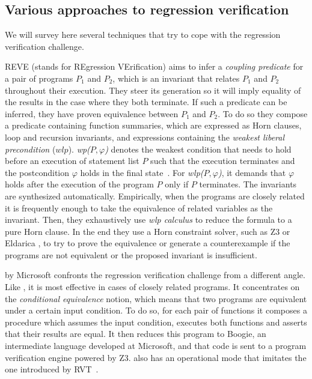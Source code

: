 \subsection{Various approaches to regression verification}
We will survey here several techniques that try to cope with the regression verification challenge.

REVE (stands for REgression VErification) \cite{DBLP:conf/kbse/FelsingGKRU14} aims to infer a \emph{coupling predicate} for a pair of programs $P_1$ and $P_2$, which is an invariant that relates $P_1$ and $P_2$ throughout their execution. They steer its generation so it will imply equality of the results in the case where they both terminate. If such a predicate can be inferred, they have proven equivalence between $P_1$ and $P_2$. To do so they compose a predicate containing function summaries, which are expressed as Horn clauses, loop and recursion invariants, and expressions containing the \emph{weakest liberal precondition} ($wlp$). \emph{wp($P,\varphi$)} denotes the weakest condition that needs to hold before an execution of statement list $P$ such that the execution terminates and the postcondition $\varphi$ holds in the final state~\cite{DBLP:journals/cacm/Dijkstra75}. For \emph{wlp($P,\varphi$)}, it demands that $\varphi$ holds after the execution of the program $P$ only if $P$ terminates. The invariants are synthesized automatically. Empirically, when the programs are closely related it is frequently enough to take the equivalence of related variables as the invariant. Then, they exhaustively use \emph{wlp calculus} to reduce the formula to a pure Horn clause. In the end they use a Horn constraint solver, such as Z3 \cite{DBLP:conf/sat/HoderB12} or Eldarica \cite{DBLP:conf/cav/RummerHK13}, to try to prove the equivalence or generate a counterexample if the programs are not equivalent or the proposed invariant is insufficient.

 by Microsoft \cite{DBLP:conf/cav/LahiriHKR12} confronts the regression verification challenge from a different angle. Like , it is most effective in cases of closely related programs. It concentrates on the \emph{conditional equivalence} notion, which means that two programs are equivalent under a certain input condition. To do so, for each pair of functions it composes a procedure which assumes the input condition, executes both functions and asserts that their results are equal. It then reduces this program to Boogie, an intermediate language developed at Microsoft, and that code is sent to a program verification engine powered by Z3.  also has an operational mode that imitates the one introduced by RVT~\cite{DBLP:conf/dac/GodlinS09}.

